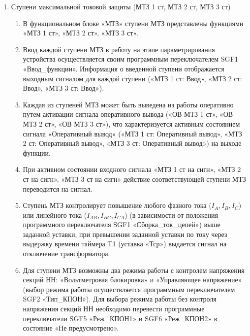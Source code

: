 \begin{enumerate}
\begin{enumerate}
\end{enumerate}


\item Ступени максимальной токовой защиты (МТЗ 1 ст, МТЗ 2 ст, МТЗ 3 ст)

\begin{enumerate}

\item
В функциональном блоке «МТЗ» ступени МТЗ представлены функциями «МТЗ 1 ст», «МТЗ 2 ст», «МТЗ 3 ст».    

\item
Ввод каждой ступени МТЗ в работу на этапе параметрирования устройства осуществляется своим программным переключателем SGF1 «Ввод\_функции». Информация о введенной ступени отображается выходным сигналом для каждой ступени («МТЗ 1 ст: Ввод», «МТЗ 2 ст: Ввод», «МТЗ 3 ст: Ввод»).

\item
Каждая из ступеней МТЗ может быть выведена из работы оперативно путем активации сигнала оперативного вывода («ОВ МТЗ 1 ст», «ОВ МТЗ 2 ст», «ОВ МТЗ 3 ст»), что характеризуется активным состоянием сигнала «Оперативный вывод» («МТЗ 1 ст: Оперативный вывод», «МТЗ 2 ст: Оперативный вывод», «МТЗ 3 ст: Оперативный вывод») на выходе функции.

\item
При активном состоянии входного сигнала «МТЗ 1 ст на сигн», «МТЗ 2 ст на сигн», «МТЗ 3 ст на сигн» действие соответствующей ступени МТЗ переводится на сигнал.

\item
Ступень МТЗ контролирует повышение любого фазного тока ($I_A, I_B, I_C$) или линейного тока ($I_{AB}, I_{BC}, I_{CA}$) (в зависимости от положения программного переключателя SGF1 «Сборка\_ток\_цепей») выше заданной уставки, при превышении заданной уставки по току через выдержку времени таймера T1 (уставка «Тср») выдается сигнал на отключение трансформатора.

\item\sloppy
Для ступени МТЗ возможны два режима работы с контролем напряжения секций НН: «Вольтметровая блокировка» и «Управляющее напряжение» (выбор режима работы осуществляется программным переключателем SGF2 «Тип\_КПОН»). Для выбора режима работы без контроля напряжения секций НН необходимо перевести программные переключатели SGF5 «Реж\_КПОН1» и SGF6 «Реж\_КПОН2» в состояние «Не предусмотрено».


\end{enumerate}
\end{enumerate}
